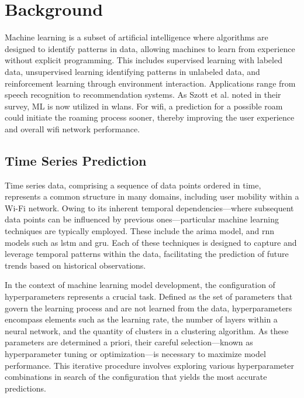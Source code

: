 \chapter{Background}\label{sec:background}

Machine learning is a subset of artificial intelligence where algorithms are designed to identify patterns in data, allowing machines to learn from experience without explicit programming.
This includes supervised learning with labeled data, unsupervised learning identifying patterns in unlabeled data, and reinforcement learning through environment interaction.
Applications range from speech recognition to recommendation systems.
As Szott et al. noted in their survey\cite{szottWiFiMeetsML2022}, ML is now utilized in \acp{wlan}.
For \ac{wifi}, a prediction for a possible roam could initiate the roaming process sooner, thereby improving the user experience and overall \ac{wifi} network performance.

\section{Time Series Prediction}
Time series data, comprising a sequence of data points ordered in time, represents a common structure in many domains, including user mobility within a Wi-Fi network.
Owing to its inherent temporal dependencies—where subsequent data points can be influenced by previous ones—particular machine learning techniques are typically employed.
These include the \ac{arima} model, and \ac{rnn} models such as \ac{lstm} and \ac{gru}.
Each of these techniques is designed to capture and leverage temporal patterns within the data, facilitating the prediction of future trends based on historical observations.

In the context of machine learning model development, the configuration of hyperparameters represents a crucial task.
Defined as the set of parameters that govern the learning process and are not learned from the data, hyperparameters encompass elements such as the learning rate, the number of layers within a neural network, and the quantity of clusters in a clustering algorithm.
As these parameters are determined a priori, their careful selection—known as hyperparameter tuning or optimization—is necessary to maximize model performance.
This iterative procedure involves exploring various hyperparameter combinations in search of the configuration that yields the most accurate predictions.

